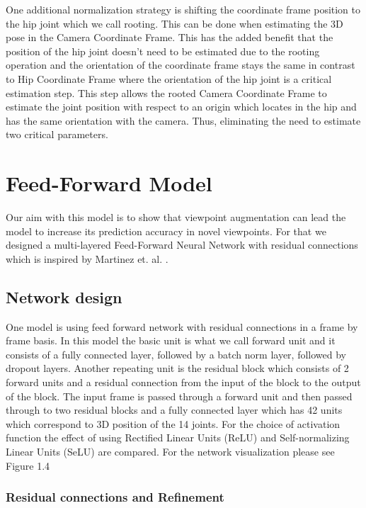 One additional normalization strategy is shifting the coordinate frame position to the hip joint which we call rooting. This can be done when estimating the 3D pose in the Camera Coordinate Frame. This has the added benefit that the position of the hip joint doesn't need to be estimated due to the rooting operation and the orientation of the coordinate frame stays the same in contrast to Hip Coordinate Frame where the orientation of the hip joint is a critical estimation step. This step allows the rooted Camera Coordinate Frame to estimate the joint position with respect to an origin which locates in the hip and has the same orientation with the camera. Thus, eliminating the need to estimate two critical parameters.

\section{Feed-Forward Model}

Our aim with this model is to show that viewpoint augmentation can lead the model to increase its prediction accuracy in novel viewpoints. For that we designed a multi-layered Feed-Forward Neural Network with residual connections \parencite{he2016deep} which is inspired by Martinez et. al. \parencite{martinez2017simple}.

\subsection{Network design}

One model is using feed forward network with residual connections in a frame by frame basis. In this model the basic unit is what we call forward unit and it consists of a fully connected layer, followed by a batch norm layer, followed by dropout layers. Another repeating unit is the residual block which consists of 2 forward units and a residual connection from the input of the block to the output of the block. The input frame is passed through a forward unit and then passed through to two residual blocks and a fully connected layer which has 42 units which correspond to 3D position of the 14 joints. For the choice of activation function the effect of using Rectified Linear Units (ReLU) \parencite{nair2010rectified} and Self-normalizing Linear Units (SeLU) \parencite{klambauer2017self} are compared. For the network visualization please see Figure 1.4

\subsubsection{Residual connections and Refinement}

